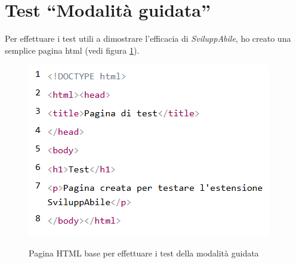 
\section{Test ``Modalità guidata''}
\noindent Per effettuare i test utili a dimostrare l'efficacia di \textit{SviluppAbile}, ho creato una semplice pagina \acrshort{html} (vedi figura \ref{fig:pagina_test}).
\begin{figure}[H]
    \centering
    \includegraphics[width=0.5\linewidth, alt={Pagina \acrshort{html} base per effettuare i test della modalità guidata}]{img/test_MG.png}
    \caption{Pagina HTML base per effettuare i test della modalità guidata}\label{fig:pagina_test}
\end{figure}


